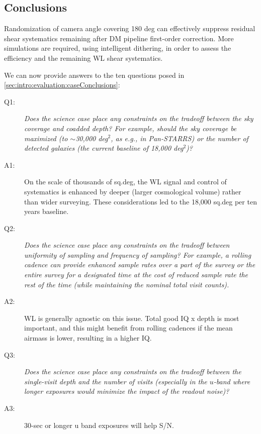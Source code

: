 \subsection{Conclusions}

Randomization of camera angle covering 180 deg can effectively suppress
residual shear systematics remaining after DM pipeline first-order
correction.   More simulations are required, using intelligent
dithering, in order to assess the efficiency and the remaining WL shear
systematics.


We can now provide answers to the ten questions posed in %
\autoref{sec:intro:evaluation:caseConclusions}:

\begin{description}

\item[Q1:] {\it Does the science case place any constraints on the
tradeoff between the sky coverage and coadded depth? For example, should
the sky coverage be maximized (to $\sim$30,000 deg$^2$, as e.g., in
Pan-STARRS) or the number of detected galaxies (the current baseline 
of 18,000 deg$^2$)?}

\item[A1:] On the scale of thousands of sq.deg, the WL signal and
control of systematics is enhanced by deeper (larger cosmological
volume) rather than wider surveying. These considerations led to the
18,000 sq.deg per ten years baseline.

\item[Q2:] {\it Does the science case place any constraints on the
tradeoff between uniformity of sampling and frequency of  sampling? For
example, a rolling cadence can provide enhanced sample rates over a part
of the survey or the entire survey for a designated time at the cost of
reduced sample rate the rest of the time (while maintaining the nominal
total visit counts).}

\item[A2:] WL is generally agnostic on this issue. Total good IQ x depth
is most important, and this might benefit from rolling cadences if the
mean airmass is lower, resulting in a higher IQ.


\item[Q3:] {\it Does the science case place any constraints on the
tradeoff between the single-visit depth and the number of visits
(especially in the $u$-band where longer exposures would minimize the
impact of the readout noise)?}

\item[A3:] 30-sec or longer u band exposures will help S/N.


\end{description}
